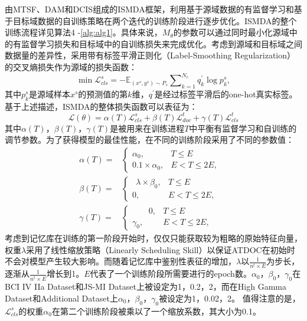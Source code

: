 由MTSF、DAM和DCIS组成的ISMDA框架，利用基于源域数据的有监督学习和基于目标域数据的自训练策略在两个迭代的训练阶段进行逐步优化。ISMDA的整个训练流程详见算法4 -\ref{alg:alg1}。具体来说，$M_\theta$的参数可以通过同时最小化源域中的有监督学习损失和目标域中的自训练损失来完成优化。考虑到源域和目标域之间数据量的差异性，采用带有标签平滑正则化（Label-Smoothing Regularization）\cite{4-8}的交叉熵损失作为源域的损失函数：
\begin{equation}
\label{deqn_ex10}
\min\mathcal{L}_{cls}^{s}=-\mathbb{E}_{\left(x^{s}, y^{s}\right) \sim P_{s}} \sum\nolimits_{k=1}^{N_{c}} q_{k}^{\prime} \log {p_k^s},
\end{equation}
其中$p_k^s$是源域样本$x^{s}$的预测值的第$k$维，$q^{\prime}$是经过标签平滑后的one-hot真实标签。基于上述描述，ISMDA的整体损失函数可以表征为：
\begin{equation}
\label{deqn_ex11}
\mathcal{L}(\theta)=\alpha(T) \mathcal{L}_{c l s}^{s}+\beta(T) \mathcal{L}_{d o c}^{t}+\gamma(T)\mathcal{L}_{cls}^{t}
\end{equation}
其中$\alpha(T)$，$\beta(T)$，$\gamma(T)$是被用来在训练进程$T$中平衡有监督学习和自训练的调节参数。为了获得模型的最佳性能，在不同的训练阶段采用了不同的参数值：
\vspace{-2mm}
\begin{subequations}
\label{eq:12}
\begin{align}
\alpha(T) =& \left\{\begin{array}{rll}
\alpha_{0},&T\leq E&\\
0.1\times\alpha_{0},&E<T\leq 2E,&
\end{array}\right.\label{eq:12A}\\[1.5mm] 
\beta(T) =& \left\{\begin{array}{rll}
\ \ \lambda \times \beta_{0} ,&T \leq E&\\
0 ,&E<T \leq 2E,&
\end{array}\right.\label{eq:12B}\\[1.5mm]
\gamma(T) =& \left\{\begin{array}{rll}
\ \ \ \ \ \ \ \ \ 0 ,&T\leq E& \\
\gamma_{0} ,&E<T \leq 2E,&
\end{array}\right.\label{eq:12C}
\end{align}
\end{subequations}
考虑到记忆库在训练的第一阶段开始时，仅仅只能获取较为粗略的原始特征向量，权重$\lambda$采用了线性缩放策略（Linearly Scheduling Skill）以保证ATDOC在初始时不会对模型产生较大影响。而随着记忆库中鉴别性表征的增加，$\lambda$以$\frac{1}{n^{t} \times E}$为步长，逐渐从$\frac{1}{n^{t} \times E}$增长到1。$E$代表了一个训练阶段所需要进行的epoch数。$\alpha_{0}$，$\beta_{0}$，$\gamma_{0}$在BCI IV IIa Dataset和JS-MI Dataset上被设定为1，0.2，2，而在High Gamma Dataset和Additional Dataset上$\alpha_{0}$，$\beta_{0}$，$\gamma_{0}$被设定为1，0.02，2。 值得注意的是，$\mathcal{L}_{c l s}^{s}$的权重$\alpha_{0}$在第二个训练阶段被乘以了一个缩放系数，其大小为0.1。




